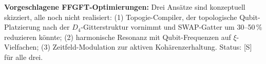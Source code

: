 \textbf{Vorgeschlagene FFGFT-Optimierungen:} Drei Ansätze sind konzeptuell
skizziert, alle noch nicht realisiert: (1) Topogie-Compiler, der
topologische Qubit-Platzierung nach der $D_4$-Gitterstruktur vornimmt
und SWAP-Gatter um 30--50\,\% reduzieren könnte; (2) harmonische Resonanz
mit Qubit-Frequenzen auf $\xi$-Vielfachen; (3) Zeitfeld-Modulation zur
aktiven Kohärenzerhaltung. Status: [S] für alle drei.

